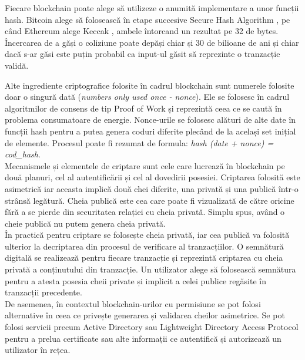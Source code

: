 Fiecare blockchain poate alege să utilizeze o anumită implementare a unor funcții hash. Bitcoin alege să folosească în etape succesive Secure Hash Algorithm \cite{Blockchain_Protocol}, pe când Ethereum alege Keccak \cite{Ethereum_Protocol}, ambele întorcand un rezultat pe 32 de bytes. Încercarea de a găși o coliziune poate depăși chiar și 30 de bilioane de ani și chiar dacă s-ar găsi este puțin probabil ca input-ul găsit să reprezinte o tranzacție validă.\\

\clearpage

Alte ingrediente criptografice folosite în cadrul blockchain sunt numerele folosite doar o singură dată (\textit{numbers only used once - nonce}). Ele se folosesc în cadrul algoritmilor de consens de tip Proof of Work și reprezintă ceea ce se caută în problema consumatoare de energie. Nonce-urile se folosesc alături de alte date în funcții hash pentru a putea genera coduri diferite plecând de la același set inițial de elemente. Procesul poate fi rezumat de formula: \textit{hash (date + nonce) = cod\_hash}.\\

Mecanismele și elementele de criptare sunt cele care lucrează în blockchain pe două planuri, cel al autentificării și cel al dovedirii posesiei. Criptarea folosită este asimetrică iar aceasta implică două chei diferite, una privată și una publică într-o strânsă legătură. Cheia publică este cea care poate fi vizualizată de către oricine fără a se pierde din securitatea relației cu cheia privată. Simplu spus, având o cheie publică nu putem genera cheia privată.\\

În practică pentru criptare se folosește cheia privată, iar cea publică va folosită ulterior la decriptarea din procesul de verificare al tranzacțiilor. O semnătură digitală se realizează pentru fiecare tranzacție și reprezintă criptarea cu cheia privată a conținutului din tranzacție. Un utilizator alege să folosească semnătura pentru a atesta posesia cheii private și implicit a celei publice regăsite în tranzacții precedente.\\

De asemenea, în contextul blockchain-urilor cu permisiune se pot folosi alternative în ceea ce privește generarea și validarea cheilor asimetrice. Se pot folosi servicii precum Active Directory sau Lightweight Directory Access Protocol pentru a prelua certificate sau alte informații ce autentifică și autorizează un utilizator în rețea.\\

